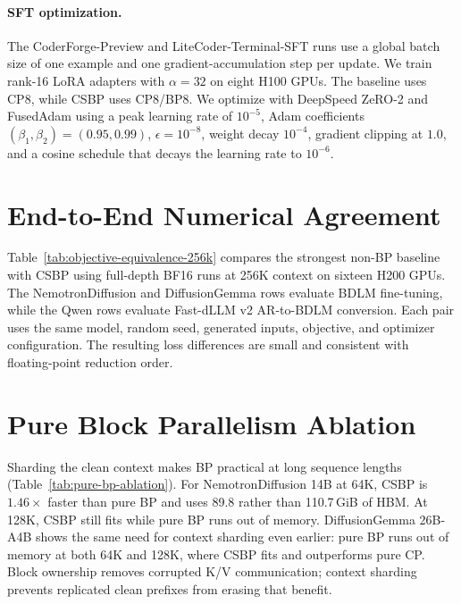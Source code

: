 \paragraph{SFT optimization.}
The CoderForge-Preview and LiteCoder-Terminal-SFT runs use a global batch size
of one example and one gradient-accumulation step per update.
We train rank-16 LoRA adapters with $\alpha=32$ on eight H100 GPUs. The
baseline uses CP8, while CSBP uses CP8/BP8.
We optimize with DeepSpeed ZeRO-2 and FusedAdam using a peak learning rate of
$10^{-5}$, Adam coefficients $(\beta_1,\beta_2)=(0.95,0.99)$,
$\epsilon=10^{-8}$, weight decay $10^{-4}$, gradient clipping at $1.0$, and a
cosine schedule that decays the learning rate to $10^{-6}$.

\section{End-to-End Numerical Agreement}
\label{app:numerical-agreement}

Table~\ref{tab:objective-equivalence-256k} compares the strongest non-BP
baseline with CSBP using full-depth BF16 runs at 256K context on sixteen H200
GPUs.  The
NemotronDiffusion and DiffusionGemma rows evaluate BDLM fine-tuning, while the
Qwen rows evaluate Fast-dLLM v2 AR-to-BDLM conversion.  Each pair uses the same
model, random seed, generated inputs, objective, and optimizer configuration.
The resulting loss differences are small and consistent with floating-point
reduction order.



\section{Pure Block Parallelism Ablation}
\label{app:pure-bp-ablation}

Sharding the clean context makes BP practical at long sequence lengths
(Table~\ref{tab:pure-bp-ablation}). For NemotronDiffusion 14B at 64K, CSBP is
$1.46\times$ faster than pure BP and uses 89.8 rather than 110.7\,GiB of HBM.
At 128K, CSBP still fits while pure BP runs out of memory. DiffusionGemma 26B-A4B
shows the same need for context sharding even earlier: pure BP runs out of
memory at both 64K and 128K, where CSBP fits and outperforms pure CP. Block ownership removes corrupted
K/V communication; context sharding prevents replicated clean prefixes from
erasing that benefit.



